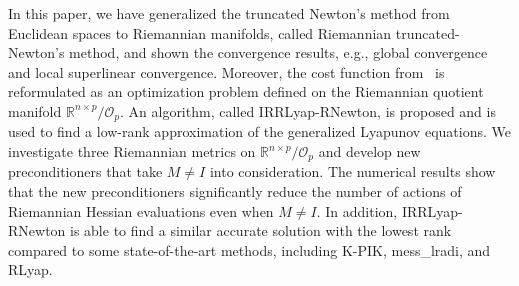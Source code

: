 \documentclass[11pt]{article}
\numberwithin{equation}{section}
\begin{document}
In this paper, we have generalized the truncated Newton's method from Euclidean spaces to Riemannian manifolds, called Riemannian truncated-Newton's method, and shown the convergence results, e.g., global convergence and local superlinear convergence. Moreover, the cost function from~\cite{Bart10} is reformulated as an optimization problem defined on the Riemannian quotient manifold $\mathbb{R}^{n\times p}/\mathcal{O}_p$. An algorithm, called IRRLyap-RNewton, is proposed and is used to find a low-rank approximation of the generalized Lyapunov equations. We investigate three Riemannian metrics on $\mathbb{R}^{n\times p}/\mathcal{O}_p$ and develop new preconditioners that take $M \neq I$ into consideration. The numerical results show that the new preconditioners significantly reduce the number of actions of Riemannian Hessian evaluations even when $M \neq I$. In addition, IRRLyap-RNewton is able to find a similar accurate solution with the lowest rank compared to some state-of-the-art methods, including K-PIK, mess\_lradi, and RLyap. %


\appendix








\end{document}
